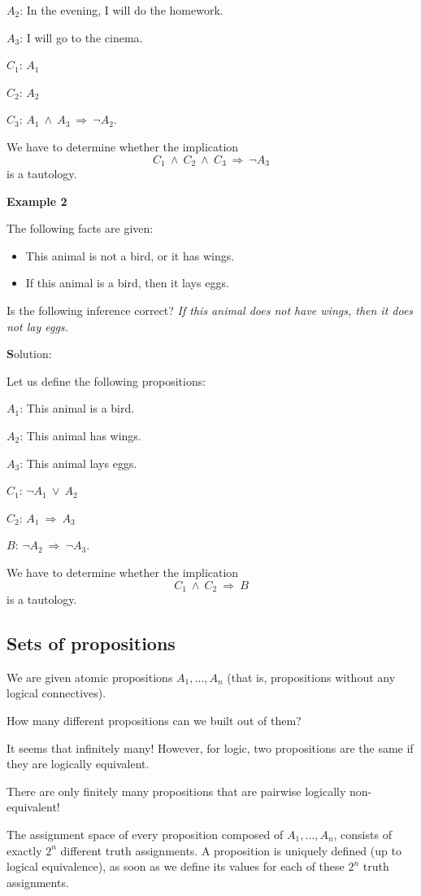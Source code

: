 \documentclass[11pt,paper=b5,footinclude,headinclude]{scrbook} %
\def\ali {{~\vee~}}
\def\inn {{~\wedge~}}
\def\sledi {{~\Rightarrow~}}
\theoremstyle{remark}
\theoremstyle{definition} %
\begin{document}
$A_2$: In the evening, I will do the homework.

$A_3$: I will go to the cinema.

$C_1$: $A_1$

$C_2$: $A_2$

$C_3$: $A_1\inn A_3\sledi \neg A_2$.

We have to determine whether the implication
$$C_1\inn C_2\inn C_3\sledi \neg A_3$$
is a tautology.

\textbf{Example 2}

The following facts are given:
\begin{itemize}
	\item This animal is not a bird, or it has wings.
	\item If this animal is a bird, then it lays eggs.
\end{itemize}
Is the following inference correct?
{\em If this animal does not have wings, then it does not lay eggs.}

\medskip
{\textbf Solution:}

Let us define the following propositions:

$A_1$: This animal is a bird.

$A_2$: This animal has wings.

$A_3$: This animal lays eggs.

$C_1$: $\neg A_1\ali A_2$

$C_2$: $A_1\sledi A_3$

$B$: $\neg A_2\sledi \neg A_3$.

We have to determine whether the implication
$$C_1\inn C_2\sledi B$$
is a tautology.

\subsection{Sets of propositions}

We are given atomic propositions $A_1,\ldots, A_n$ (that is, propositions without any logical connectives).

How many different propositions can we built out of them?

It seems that infinitely many! However, for logic, two propositions are the same if they are logically equivalent.

There are only finitely many propositions that are pairwise logically non-equivalent!

The assignment space of every proposition composed of $A_1,\ldots, A_n$, consists of exactly $2^n$ different truth assignments.
A proposition is uniquely defined (up to logical equivalence), as soon as we define its values for each of these $2^n$ truth assignments.
\end{document}
